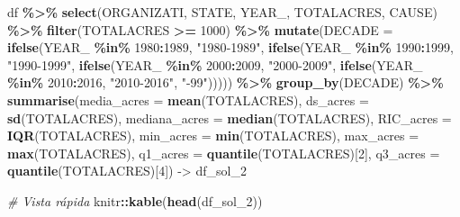 \documentclass[
]{book}
\newenvironment{Shaded}{\begin{snugshade}}{\end{snugshade}}
\newcommand{\AttributeTok}[1]{\textcolor[rgb]{0.13,0.29,0.53}{#1}}
\newcommand{\CommentTok}[1]{\textcolor[rgb]{0.56,0.35,0.01}{\textit{#1}}}
\newcommand{\DecValTok}[1]{\textcolor[rgb]{0.00,0.00,0.81}{#1}}
\newcommand{\FunctionTok}[1]{\textcolor[rgb]{0.13,0.29,0.53}{\textbf{#1}}}
\newcommand{\NormalTok}[1]{#1}
\newcommand{\OtherTok}[1]{\textcolor[rgb]{0.56,0.35,0.01}{#1}}
\newcommand{\SpecialCharTok}[1]{\textcolor[rgb]{0.81,0.36,0.00}{\textbf{#1}}}
\newcommand{\StringTok}[1]{\textcolor[rgb]{0.31,0.60,0.02}{#1}}
\begin{document}
\begin{Shaded}
\begin{Highlighting}[]
\NormalTok{df }\SpecialCharTok{\%\textgreater{}\%}
  \FunctionTok{select}\NormalTok{(ORGANIZATI, STATE, YEAR\_, TOTALACRES, CAUSE) }\SpecialCharTok{\%\textgreater{}\%}
  \FunctionTok{filter}\NormalTok{(TOTALACRES }\SpecialCharTok{\textgreater{}=} \DecValTok{1000}\NormalTok{) }\SpecialCharTok{\%\textgreater{}\%} 
  \FunctionTok{mutate}\NormalTok{(}\AttributeTok{DECADE =} \FunctionTok{ifelse}\NormalTok{(YEAR\_ }\SpecialCharTok{\%in\%} \DecValTok{1980}\SpecialCharTok{:}\DecValTok{1989}\NormalTok{, }\StringTok{"1980{-}1989"}\NormalTok{, }
                          \FunctionTok{ifelse}\NormalTok{(YEAR\_ }\SpecialCharTok{\%in\%} \DecValTok{1990}\SpecialCharTok{:}\DecValTok{1999}\NormalTok{, }\StringTok{"1990{-}1999"}\NormalTok{,}
                          \FunctionTok{ifelse}\NormalTok{(YEAR\_ }\SpecialCharTok{\%in\%} \DecValTok{2000}\SpecialCharTok{:}\DecValTok{2009}\NormalTok{, }\StringTok{"2000{-}2009"}\NormalTok{, }
                          \FunctionTok{ifelse}\NormalTok{(YEAR\_ }\SpecialCharTok{\%in\%} \DecValTok{2010}\SpecialCharTok{:}\DecValTok{2016}\NormalTok{, }\StringTok{"2010{-}2016"}\NormalTok{, }\StringTok{"{-}99"}\NormalTok{))))) }\SpecialCharTok{\%\textgreater{}\%} 
  \FunctionTok{group\_by}\NormalTok{(DECADE) }\SpecialCharTok{\%\textgreater{}\%} 
  \FunctionTok{summarise}\NormalTok{(}\AttributeTok{media\_acres =} \FunctionTok{mean}\NormalTok{(TOTALACRES),}
            \AttributeTok{ds\_acres =} \FunctionTok{sd}\NormalTok{(TOTALACRES),}
            \AttributeTok{mediana\_acres =} \FunctionTok{median}\NormalTok{(TOTALACRES),}
            \AttributeTok{RIC\_acres =} \FunctionTok{IQR}\NormalTok{(TOTALACRES),}
            \AttributeTok{min\_acres =} \FunctionTok{min}\NormalTok{(TOTALACRES),}
            \AttributeTok{max\_acres =} \FunctionTok{max}\NormalTok{(TOTALACRES),}
            \AttributeTok{q1\_acres =} \FunctionTok{quantile}\NormalTok{(TOTALACRES)[}\DecValTok{2}\NormalTok{],}
            \AttributeTok{q3\_acres =} \FunctionTok{quantile}\NormalTok{(TOTALACRES)[}\DecValTok{4}\NormalTok{]) }\OtherTok{{-}\textgreater{}}\NormalTok{ df\_sol\_2}

\CommentTok{\# Vista rápida}
\NormalTok{knitr}\SpecialCharTok{::}\FunctionTok{kable}\NormalTok{(}\FunctionTok{head}\NormalTok{(df\_sol\_2))}
\end{Highlighting}
\end{Shaded}
\end{document}
